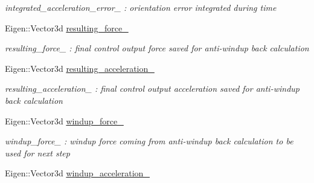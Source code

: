 \begin{DoxyCompactItemize}
\begin{DoxyCompactList}\small\item\em integrated\-\_\-acceleration\-\_\-error\-\_\- \-: orientation error integrated during time \end{DoxyCompactList}\item 
\hypertarget{class_skye_geometric_controller_a59dc3b6287c2cf288c0190e2cc93220d}{Eigen\-::\-Vector3d \hyperlink{class_skye_geometric_controller_a59dc3b6287c2cf288c0190e2cc93220d}{resulting\-\_\-force\-\_\-}}\label{class_skye_geometric_controller_a59dc3b6287c2cf288c0190e2cc93220d}

\begin{DoxyCompactList}\small\item\em resulting\-\_\-force\-\_\- \-: final control output force saved for anti-\/windup back calculation \end{DoxyCompactList}\item 
\hypertarget{class_skye_geometric_controller_a7fbf194406b40d85be3800aa5fcce9c1}{Eigen\-::\-Vector3d \hyperlink{class_skye_geometric_controller_a7fbf194406b40d85be3800aa5fcce9c1}{resulting\-\_\-acceleration\-\_\-}}\label{class_skye_geometric_controller_a7fbf194406b40d85be3800aa5fcce9c1}

\begin{DoxyCompactList}\small\item\em resulting\-\_\-acceleration\-\_\- \-: final control output acceleration saved for anti-\/windup back calculation \end{DoxyCompactList}\item 
\hypertarget{class_skye_geometric_controller_a7e268f8507973e99b2ce9fd530ba01be}{Eigen\-::\-Vector3d \hyperlink{class_skye_geometric_controller_a7e268f8507973e99b2ce9fd530ba01be}{windup\-\_\-force\-\_\-}}\label{class_skye_geometric_controller_a7e268f8507973e99b2ce9fd530ba01be}

\begin{DoxyCompactList}\small\item\em windup\-\_\-force\-\_\- \-: windup force coming from anti-\/windup back calculation to be used for next step \end{DoxyCompactList}\item 
\hypertarget{class_skye_geometric_controller_afdde712a7ed20bdef85387463d52ef5a}{Eigen\-::\-Vector3d \hyperlink{class_skye_geometric_controller_afdde712a7ed20bdef85387463d52ef5a}{windup\-\_\-acceleration\-\_\-}}\label{class_skye_geometric_controller_afdde712a7ed20bdef85387463d52ef5a}


\end{DoxyCompactItemize}
